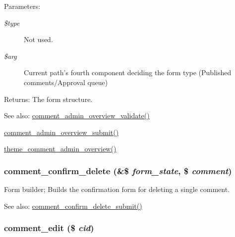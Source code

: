 \begin{Desc}
\item[Parameters:]
\begin{description}
\item[{\em \$type}]Not used. \item[{\em \$arg}]Current path's fourth component deciding the form type (Published comments/Approval queue) \end{description}
\end{Desc}
\begin{Desc}
\item[Returns:]The form structure.\end{Desc}
\begin{Desc}
\item[See also:]\hyperlink{comment_8admin_8inc_60a994bc18cf6f4a9a71a478700f973e}{comment\_\-admin\_\-overview\_\-validate()} 

\hyperlink{comment_8admin_8inc_e242a86117c7b818ad449f42dd63706c}{comment\_\-admin\_\-overview\_\-submit()} 

\hyperlink{group__themeable_g206b5909bfdb91cc12f8f10edadbf45d}{theme\_\-comment\_\-admin\_\-overview()} \end{Desc}
\hypertarget{group__forms_g412ca079e734ea4128aa16477141b82c}{
\subsubsection[{comment\_\-confirm\_\-delete}]{\setlength{\rightskip}{0pt plus 5cm}comment\_\-confirm\_\-delete (\&\$ {\em form\_\-state}, \/  \$ {\em comment})}}
\label{group__forms_g412ca079e734ea4128aa16477141b82c}


Form builder; Builds the confirmation form for deleting a single comment.

\begin{Desc}
\item[See also:]\hyperlink{comment_8admin_8inc_4a91e7877e246726a22e875c215845bd}{comment\_\-confirm\_\-delete\_\-submit()} \end{Desc}
\hypertarget{group__forms_g3679a2cbccaa0c479918ff54748d5334}{
\subsubsection[{comment\_\-edit}]{\setlength{\rightskip}{0pt plus 5cm}comment\_\-edit (\$ {\em cid})}}
\label{group__forms_g3679a2cbccaa0c479918ff54748d5334}


